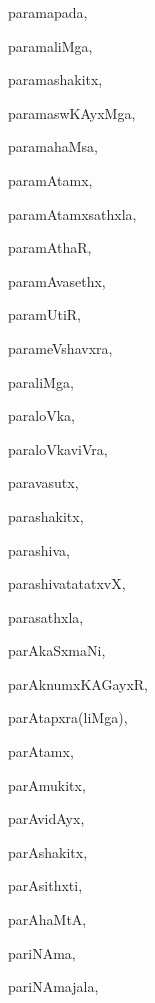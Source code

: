 \begin{multicols}{3}
{\noindent
{paramapada}, \pageref{paramapada}

\noindent
{paramaliMga}, \pageref{paramaliMga}

\noindent
{paramashakitx}, \pageref{paramashakitx}

\noindent
{paramaswKAyxMga}, \pageref{paramaswKAyxMga}

\noindent
{paramahaMsa}, \pageref{paramahaMsa}

\noindent
{paramAtamx}, \pageref{paramAtamx}

\noindent
{paramAtamxsathxla}, \pageref{paramAtamxsathxla}

\noindent
{paramAthaR}, \pageref{paramAthaR}

\noindent
{paramAvasethx}, \pageref{paramAvasethx}

\noindent
{paramUtiR}, \pageref{paramUtiR}

\noindent
{parameVshavxra}, \pageref{parameVshavxra}

\noindent
{paraliMga}, \pageref{paraliMga}

\noindent
{paraloVka}, \pageref{paraloVka}

\noindent
{paraloVkaviVra}, \pageref{paraloVkaviVra}

\noindent
{paravasutx}, \pageref{paravasutx}

\noindent
{parashakitx}, \pageref{parashakitx}

\noindent
{parashiva}, \pageref{parashiva}

\noindent
{parashivatatatxvX}, \pageref{parashivatatatxvX}

\noindent
{parasathxla}, \pageref{parasathxla}

\noindent
{parAkaSxmaNi}, \pageref{parAkaSxmaNi}

\noindent
{parAknumxKAGayxR}, \pageref{parAknumxKAGayxR}

\noindent
{parAtapxra(liMga)}, \pageref{parAtapxraliMga}

\noindent
{parAtamx}, \pageref{parAtamx}

\noindent
{parAmukitx}, \pageref{parAmukitx}

\noindent
{parAvidAyx}, \pageref{parAvidAyx}

\noindent
{parAshakitx}, \pageref{parAshakitx}

\noindent
{parAsithxti}, \pageref{parAsithxti}

\noindent
{parAhaMtA}, \pageref{parAhaMtA}

\noindent
{pariNAma}, \pageref{pariNAma}

\noindent
{pariNAmajala}, \pageref{pariNAmajala}

}
\end{multicols}
